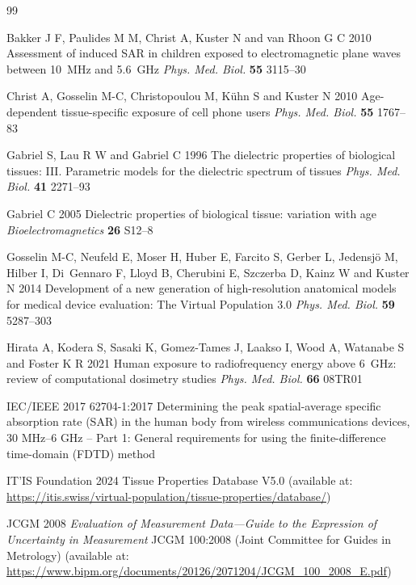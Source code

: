 \documentclass{iopjournal}
\begin{document}
\begin{thebibliography}{99}

Bakker J F, Paulides M M, Christ A, Kuster N and van Rhoon G C 2010 Assessment of induced SAR in children exposed to electromagnetic plane waves between 10~MHz and 5.6~GHz \emph{Phys. Med. Biol.} \textbf{55} 3115--30

Christ A, Gosselin M-C, Christopoulou M, K{\"u}hn S and Kuster N 2010 Age-dependent tissue-specific exposure of cell phone users \emph{Phys. Med. Biol.} \textbf{55} 1767--83

Gabriel S, Lau R W and Gabriel C 1996 The dielectric properties of biological tissues: III. Parametric models for the dielectric spectrum of tissues \emph{Phys. Med. Biol.} \textbf{41} 2271--93

Gabriel C 2005 Dielectric properties of biological tissue: variation with age \emph{Bioelectromagnetics} \textbf{26} S12--8

Gosselin M-C, Neufeld E, Moser H, Huber E, Farcito S, Gerber L, Jedensj{\"o} M, Hilber I, Di~Gennaro F, Lloyd B, Cherubini E, Szczerba D, Kainz W and Kuster N 2014 Development of a new generation of high-resolution anatomical models for medical device evaluation: The Virtual Population 3.0 \emph{Phys. Med. Biol.} \textbf{59} 5287--303

Hirata A, Kodera S, Sasaki K, Gomez-Tames J, Laakso I, Wood A, Watanabe S and Foster K R 2021 Human exposure to radiofrequency energy above 6~GHz: review of computational dosimetry studies \emph{Phys. Med. Biol.} \textbf{66} 08TR01

IEC/IEEE 2017 62704-1:2017 Determining the peak spatial-average specific absorption rate (SAR) in the human body from wireless communications devices, 30 MHz--6 GHz -- Part 1: General requirements for using the finite-difference time-domain (FDTD) method

IT'IS Foundation 2024 Tissue Properties Database V5.0 (available at: \url{https://itis.swiss/virtual-population/tissue-properties/database/})

JCGM 2008 \emph{Evaluation of Measurement Data---Guide to the Expression of Uncertainty in Measurement} JCGM 100:2008 (Joint Committee for Guides in Metrology) (available at: \url{https://www.bipm.org/documents/20126/2071204/JCGM_100_2008_E.pdf})


\end{thebibliography}
\end{document}
